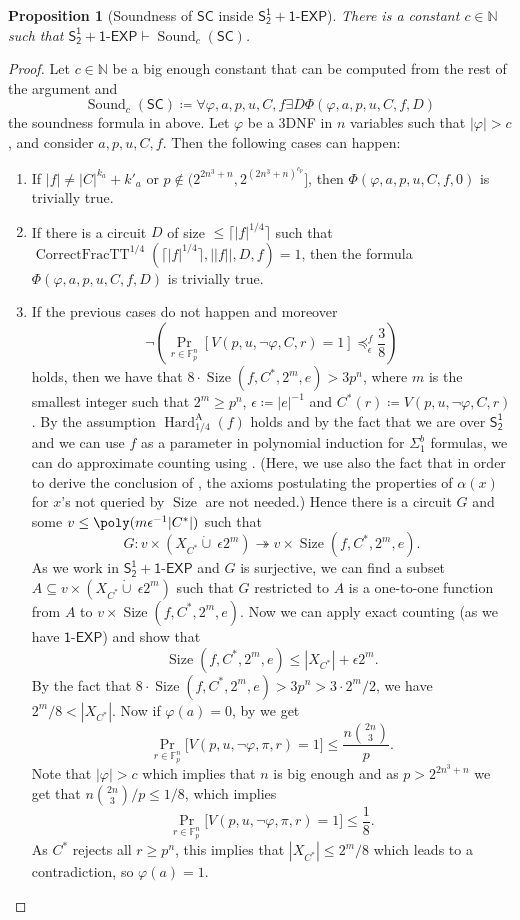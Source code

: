 \documentclass[11pt]{article}
\newcommand{\SOT}{\mathsf{S^1_2}}
\newcommand{\SOTEXP}{\mathsf{S^1_2} + \mathsf{1\textsf{-}EXP}}
\renewcommand{\SC}{\mathsf{SC}}
\newcommand{\sound}{\operatorname{Sound}}
\DeclareMathOperator*{\foo}{Pr}
\newcommand{\setsize}{\operatorname{Size}}
\def\tt{\operatorname{CorrectFracTT}}
\def\hardav{\operatorname{Hard}_{1/4}^\text{A}}
\def\rra{\twoheadrightarrow}
\def\OEXP{\mathsf{1\textsf{-}EXP}}
\theoremstyle{definition}
\theoremstyle{plain}
\newtheorem{proposition}[definition]{Proposition}
\theoremstyle{remark}
\newcommand{\EmilU}{\mathbin{\dot{\cup}}}
\newcommand{\bN}{\mathbb{N}}
\newcommand{\bF}{\mathbb{F}}
\begin{document}
\begin{proposition}[Soundness of $\SC$ inside $\SOTEXP$]
    There is a constant $c\in\bN$ such that $\SOTEXP\vdash\sound_c(\SC)$.
\end{proposition}
\begin{proof}
    Let $c\in\bN$ be a big enough constant that can be computed from the rest of the argument and $$\sound_c(\SC)\coloneqq\forall \varphi,a,p,u,C,f\exists D\Phi(\varphi,a,p,u,C,f,D)$$ the soundness formula in  above. Let $\varphi$ be a 3DNF in $n$ variables such that $|\varphi|>c$, 
 and consider $a,p,u,C,f$. Then the following cases can happen:
 \begin{enumerate}[label=(\alph*)]
     \item If $|f|\neq|C|^{k_a}+k'_a$ or $p\not\in (2^{2n^3+n},2^{{(2n^3+n)}^{c_p}}]$, then $\Phi(\varphi,a,p,u,C,f,0)$ is trivially true.
     \item If there is a circuit $D$ of size $\leq \lceil|f|^{1/4}\rceil$ such that $\tt^{1/4}(\lceil|f|^{1/4}\rceil,||f||,D,f)=1$, then the formula $\Phi(\varphi,a,p,u,C,f,D)$ is trivially true.
     \item If the previous cases do not happen and moreover $$\neg\left(\foo_{r\in\bF_p^n}[V(p,u,\neg\varphi,C,r)=1]\preceq^f_\epsilon \frac{3}{8}\right)$$ holds, then we have that $8\cdot \setsize(f, C^*,2^m,e)> 3p^n$,  where $m$ is the smallest integer such that $2^m\ge p^n$, $\epsilon\coloneqq|e|^{-1}$ and $C^*(r)\coloneqq V(p,u,\neg\varphi,C,r)$. By the assumption $\hardav(f)$ holds and by the fact that we are over $\SOT$ and we can use $f$ as a parameter in polynomial induction for $\Sigma^b_1$ formulas, we can do approximate counting using . (Here, we use also the fact that in order to derive the conclusion of , the axioms postulating the properties  of $\alpha(x)$ for $x$'s not queried by $\setsize$ are not needed.) Hence there is a circuit $G$ and some $v\leq \poly(m\epsilon^{-1}|C^*|)$ such that
$$G:v\times(X_{C^*}\EmilU\:\epsilon 2^m)\rra v\times\setsize(f,C^*,2^m,e).$$
As we work in $\SOTEXP$ and $G$ is surjective, we can find  a subset $A\subseteq v\times(X_{C^*}\EmilU\:\epsilon 2^m)$ such that $G$ restricted to $A$ is a one-to-one function from $A$ to $v\times\setsize(f,C^*,2^m,e)$. Now we can apply exact counting (as we have $\OEXP$) and show that
 $$\setsize(f,C^*,2^m,e)\leq |X_{C^*}|+\epsilon 2^m.$$
 By the fact that $8\cdot \setsize(f, C^*,2^m,e)> 3p^n>3\cdot 2^m/2$, we have ${2^m}/{8}<|X_{C^*}|$.
Now if $\varphi(a)=0$, by  we get
$$\foo_{r\in\bF_p^n}\big[V(p,u,\neg\varphi,\pi,r)=1\big]\leq \frac{n\binom{2n}{3}}{p}.$$
Note that $|\varphi|>c$ which implies that $n$ is big enough and as $p>2^{2n^3+n}$ we get that ${n\binom{2n}{3}}/{p}\leq {1/8}$, which implies
$$\foo_{r\in\bF_p^n}\big[V(p,u,\neg\varphi,\pi,r)=1\big]\leq {\frac{1}{8}}.$$ As $C^*$ rejects all $r\ge p^n$, this implies that $|X_{C^*}|\leq {2^m}/{8}$ which leads to a contradiction, so $\varphi(a)=1$.
 \end{enumerate}
\end{proof}
\end{document}
